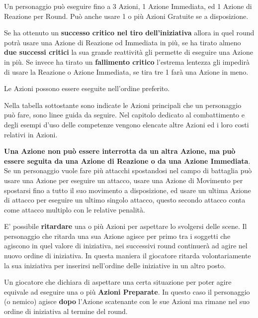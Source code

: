 \begin{multicols}{2}
Un personaggio può eseguire fino a 3 Azioni, 1 Azione Immediata, ed 1 Azione di Reazione per Round. Può anche usare 1 o più Azioni Gratuite se a disposizione.

Se ha ottenuto un \textbf{successo critico nel tiro dell'iniziativa} allora in quel round potrà usare una Azione di Reazione od Immediata in più, se ha tirato almeno \textbf{due successi critici} la sua grande reattività gli permette di eseguire una Azione in più. Se invece ha tirato un \textbf{fallimento critico} l'estrema lentezza gli impedirà di usare la Reazione o Azione Immediata, se tira tre 1 farà una Azione in meno.

Le Azioni possono essere eseguite nell'ordine preferito.

Nella tabella sottostante sono indicate le Azioni principali che un personaggio può fare, sono linee guida da seguire. Nel capitolo dedicato al combattimento e degli esempi d'uso delle competenze vengono elencate altre Azioni ed i loro costi relativi in Azioni.

\textbf{Una Azione non può essere interrotta da un altra Azione, ma può essere seguita da una Azione di Reazione o da una Azione Immediata}. 
Se un personaggio vuole fare più attacchi spostandosi nel campo di battaglia può usare una Azione per eseguire un attacco, usare una Azione di Movimento per spostarsi fino a tutto il suo movimento a disposizione, ed usare un ultima Azione di attacco per eseguire un ultimo singolo attacco, questo secondo attacco conta come attacco multiplo con le relative penalità.

E' possibile \textbf{ritardare} una o più Azioni per aspettare lo svolgersi delle scene. Il personaggio che ritarda una sua Azione agisce per primo tra i soggetti che agiscono in quel valore di iniziativa, nei successivi round continuerà ad agire nel nuovo ordine di iniziativa. In questa maniera il giocatore ritarda volontariamente la sua iniziativa per inserirsi nell'ordine delle iniziative in un altro posto.

Un giocatore che dichiara di aspettare una certa situazione per poter agire equivale ad eseguire una o più \textbf{Azioni Preparate}. In questo caso il personaggio (o nemico) agisce \textbf{dopo} l'Azione scatenante con le sue Azioni ma rimane nel suo ordine di iniziativa al termine del round.


\end{multicols}
